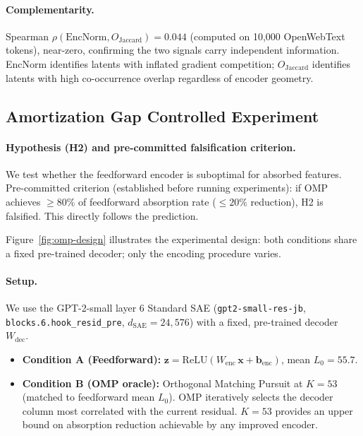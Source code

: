 \documentclass{article}
\begin{document}
\paragraph{Complementarity.} Spearman $\rho(\mathrm{EncNorm}, O_\mathrm{Jaccard}) = 0.044$
(computed on 10,000 OpenWebText tokens), near-zero, confirming the two signals carry
independent information. EncNorm identifies latents with inflated gradient competition;
$O_\mathrm{Jaccard}$ identifies latents with high co-occurrence overlap regardless of encoder
geometry.

\subsection{Amortization Gap Controlled Experiment}
\label{sec:omp}

\paragraph{Hypothesis (H2) and pre-committed falsification criterion.} We test whether the
feedforward encoder is suboptimal for absorbed features. Pre-committed criterion (established
before running experiments): if OMP achieves $\geq 80\%$ of feedforward absorption rate
($\leq 20\%$ reduction), H2 is falsified. This directly follows the
\citeauthor{oneill2024amortization} prediction.

Figure~\ref{fig:omp-design} illustrates the experimental design: both conditions share a
fixed pre-trained decoder; only the encoding procedure varies.

\paragraph{Setup.} We use the GPT-2-small layer 6 Standard SAE
(\texttt{gpt2-small-res-jb}, \texttt{blocks.6.hook\_resid\_pre}, $d_\mathrm{SAE} = 24{,}576$)
with a fixed, pre-trained decoder $W_\mathrm{dec}$.
\begin{itemize}
  \item \textbf{Condition A (Feedforward):} $\mathbf{z} = \mathrm{ReLU}(W_\mathrm{enc}\,\mathbf{x} + \mathbf{b}_\mathrm{enc})$, mean $L_0 = 55.7$.
  \item \textbf{Condition B (OMP oracle):} Orthogonal Matching Pursuit at $K=53$ (matched to
    feedforward mean $L_0$). OMP iteratively selects the decoder column most correlated with
    the current residual. $K=53$ provides an upper bound on absorption reduction achievable by
    any improved encoder.
\end{itemize}
\end{document}
